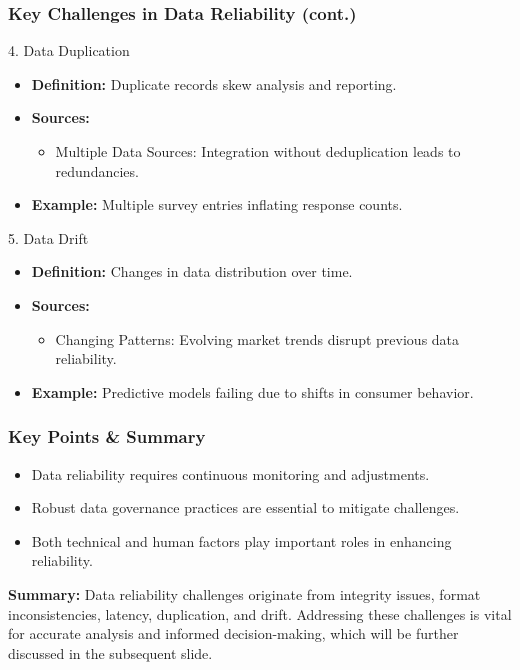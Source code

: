 \documentclass{beamer}
\begin{document}
\begin{frame}[fragile]
    \frametitle{Key Challenges in Data Reliability (cont.)}
    \begin{block}{4. Data Duplication}
        \begin{itemize}
            \item \textbf{Definition:} Duplicate records skew analysis and reporting.
            \item \textbf{Sources:}
                \begin{itemize}
                    \item Multiple Data Sources: Integration without deduplication leads to redundancies.
                \end{itemize}
            \item \textbf{Example:} Multiple survey entries inflating response counts.
        \end{itemize}
    \end{block}

    \begin{block}{5. Data Drift}
        \begin{itemize}
            \item \textbf{Definition:} Changes in data distribution over time.
            \item \textbf{Sources:}
                \begin{itemize}
                    \item Changing Patterns: Evolving market trends disrupt previous data reliability.
                \end{itemize}
            \item \textbf{Example:} Predictive models failing due to shifts in consumer behavior.
        \end{itemize}
    \end{block}
\end{frame}

\begin{frame}[fragile]
    \frametitle{Key Points & Summary}
    \begin{itemize}
        \item Data reliability requires continuous monitoring and adjustments.
        \item Robust data governance practices are essential to mitigate challenges.
        \item Both technical and human factors play important roles in enhancing reliability.
    \end{itemize}

    \textbf{Summary:} Data reliability challenges originate from integrity issues, format inconsistencies, latency, duplication, and drift. Addressing these challenges is vital for accurate analysis and informed decision-making, which will be further discussed in the subsequent slide.
\end{frame}
\end{document}
